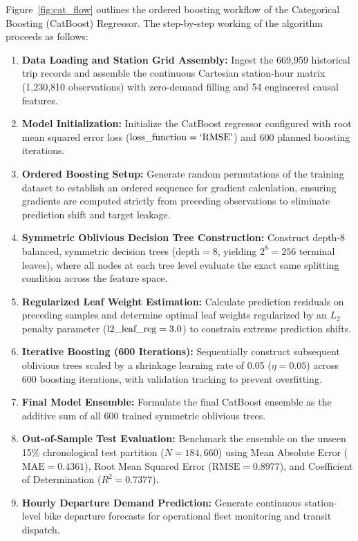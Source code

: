\documentclass[12pt, a4paper]{article}
\renewcommand{\_}{\textunderscore\allowbreak}
\begin{document}
Figure~\ref{fig:cat_flow} outlines the ordered boosting workflow of the Categorical Boosting (CatBoost) Regressor. The step-by-step working of the algorithm proceeds as follows:
\begin{enumerate}
    \item \textbf{Data Loading and Station Grid Assembly:} Ingest the 669,959 historical trip records and assemble the continuous Cartesian station-hour matrix (1,230,810 observations) with zero-demand filling and 54 engineered causal features.
    \item \textbf{Model Initialization:} Initialize the CatBoost regressor configured with root mean squared error loss ($\text{loss\_function} = \text{`RMSE'}$) and 600 planned boosting iterations.
    \item \textbf{Ordered Boosting Setup:} Generate random permutations of the training dataset to establish an ordered sequence for gradient calculation, ensuring gradients are computed strictly from preceding observations to eliminate prediction shift and target leakage.
    \item \textbf{Symmetric Oblivious Decision Tree Construction:} Construct depth-8 balanced, symmetric decision trees ($\text{depth} = 8$, yielding $2^8 = 256$ terminal leaves), where all nodes at each tree level evaluate the exact same splitting condition across the feature space.
    \item \textbf{Regularized Leaf Weight Estimation:} Calculate prediction residuals on preceding samples and determine optimal leaf weights regularized by an $L_2$ penalty parameter ($\text{l2\_leaf\_reg} = 3.0$) to constrain extreme prediction shifts.
    \item \textbf{Iterative Boosting (600 Iterations):} Sequentially construct subsequent oblivious trees scaled by a shrinkage learning rate of 0.05 ($\eta = 0.05$) across 600 boosting iterations, with validation tracking to prevent overfitting.
    \item \textbf{Final Model Ensemble:} Formulate the final CatBoost ensemble as the additive sum of all 600 trained symmetric oblivious trees.
    \item \textbf{Out-of-Sample Test Evaluation:} Benchmark the ensemble on the unseen 15\% chronological test partition ($N = 184,660$) using Mean Absolute Error ($\text{MAE} = 0.4361$), Root Mean Squared Error ($\text{RMSE} = 0.8977$), and Coefficient of Determination ($R^2 = 0.7377$).
    \item \textbf{Hourly Departure Demand Prediction:} Generate continuous station-level bike departure forecasts for operational fleet monitoring and transit dispatch.
\end{enumerate}
\end{document}

